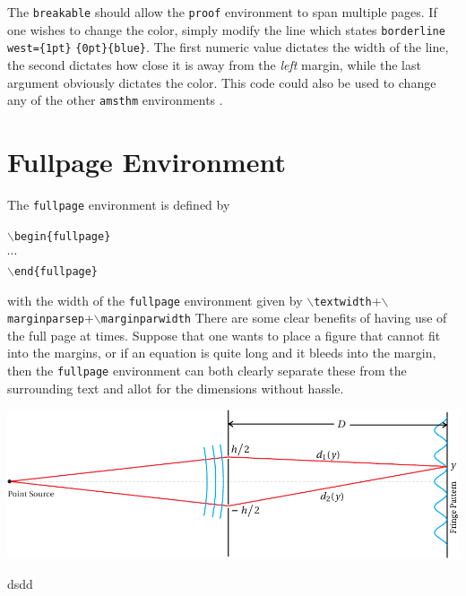 \documentclass[]{subook}
\begin{document}
The \texttt{breakable} should allow the \texttt{proof} environment to span multiple pages. If one wishes to change the color, simply modify the line which states \texttt{borderline west=\{1pt\}} \texttt{\{0pt\}\{blue\}}. The first numeric value dictates the width of the line, the second dictates how close it is away from the \textit{left} margin, while the last argument obviously dictates the color. This code could also be used to change any of the other \texttt{amsthm} environments
.


\section{Fullpage Environment}\label{Sec: Fullpage}

\begin{fullpage}
    The \texttt{fullpage} environment is defined by
    \begin{center}
        \texttt{$\backslash$begin\{fullpage\}}\\
        $\cdots$\\
        \texttt{$\backslash$end\{fullpage\}}
    \end{center}
    with the width of the \texttt{fullpage} environment given by \texttt{$\backslash$textwidth}+\texttt{$\backslash$marginparsep}+\texttt{$\backslash$marginparwidth}
    There are some clear benefits of having use of the full page at times. Suppose that one wants to place a figure that cannot fit into the margins, or if an equation is quite long and it bleeds into
     the margin, 
    then the \texttt{fullpage} environment can both clearly separate these from the surrounding text and allot for the dimensions without hassle. 

    \centering
        \includegraphics{img/f08Young.pdf}
        \label{fig:example} %
    \begin{definition}
        dsdd
    \end{definition}
\end{fullpage}
\end{document}

